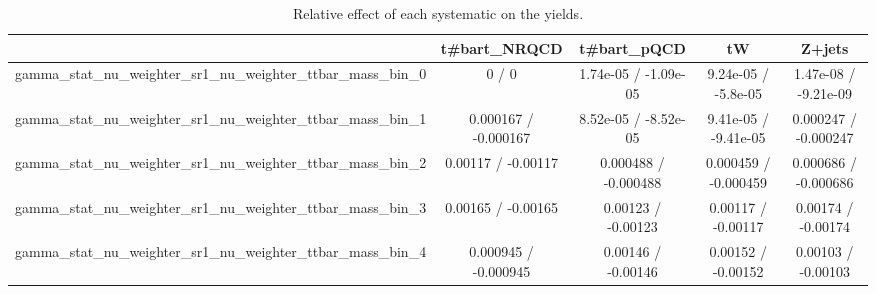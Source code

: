 \documentclass[10pt]{article}
\begin{document}
\begin{table}[htbp]
\begin{center}
\begin{tabular}{|c|c|c|c|c|}
\hline 
      & t#bar{t}_{NRQCD}      & t#bar{t}_{pQCD}      & tW      & Z+jets \\ 
\hline 
  gamma_stat_nu_weighter_sr1_nu_weighter_ttbar_mass_bin_0 & 0 / 0 & 1.74e-05 / -1.09e-05 & 9.24e-05 / -5.8e-05 & 1.47e-08 / -9.21e-09 \\ 
  gamma_stat_nu_weighter_sr1_nu_weighter_ttbar_mass_bin_1 & 0.000167 / -0.000167 & 8.52e-05 / -8.52e-05 & 9.41e-05 / -9.41e-05 & 0.000247 / -0.000247 \\ 
  gamma_stat_nu_weighter_sr1_nu_weighter_ttbar_mass_bin_2 & 0.00117 / -0.00117 & 0.000488 / -0.000488 & 0.000459 / -0.000459 & 0.000686 / -0.000686 \\ 
  gamma_stat_nu_weighter_sr1_nu_weighter_ttbar_mass_bin_3 & 0.00165 / -0.00165 & 0.00123 / -0.00123 & 0.00117 / -0.00117 & 0.00174 / -0.00174 \\ 
  gamma_stat_nu_weighter_sr1_nu_weighter_ttbar_mass_bin_4 & 0.000945 / -0.000945 & 0.00146 / -0.00146 & 0.00152 / -0.00152 & 0.00103 / -0.00103 \\ 
\hline 
\end{tabular} 
\caption{Relative effect of each systematic on the yields.} 
\end{center} 
\end{table} 
\end{document}
